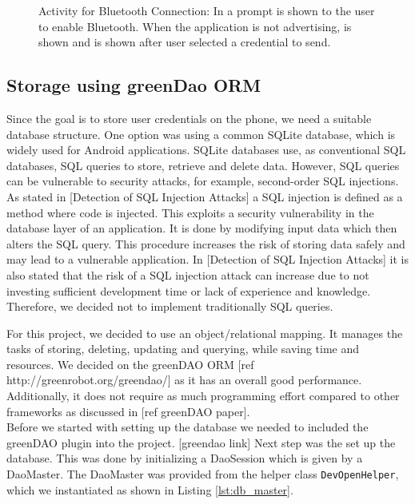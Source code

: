\begin{figure}[H]
\caption[Activity for Bluetooth Connection]{Activity for Bluetooth Connection: In \protect{} a prompt is shown to the user to enable Bluetooth. When the application is not advertising, \protect{} is shown and \protect{} is shown after user selected a credential to send.}
\label{fig:connectionactivity}
\end{figure}



\subsection{Storage using greenDao ORM}
Since the goal is to store user credentials on the phone,  we need a suitable database structure. One option was using a common SQLite database, which is widely used for Android applications. SQLite databases use, as conventional SQL databases, SQL queries to store, retrieve and delete data. However, SQL queries can be vulnerable to security attacks, for example, second-order SQL injections. As stated in [Detection of SQL Injection Attacks] a SQL injection is defined as a method where code is injected. This exploits a security vulnerability in the database layer of an application. It is done by modifying input data which then alters the SQL query. This procedure increases the risk of storing data safely and may lead to a vulnerable application. In [Detection of SQL Injection Attacks] it is also stated that the risk of a SQL injection attack can increase due to not investing sufficient development time or lack of experience and knowledge. Therefore, we decided not to implement traditionally SQL queries.

For this project, we decided to use an object/relational mapping. It manages the tasks of storing, deleting, updating and querying, while saving time and resources. We decided on the greenDAO ORM [ref http://greenrobot.org/greendao/] as it has an overall good performance. Additionally, it does not require as much programming effort compared to other frameworks as discussed in [ref greenDAO paper]. \\

Before we started with setting up the database we needed to included the greenDAO plugin into the project. [greendao link] Next step was the set up the database. This was done by initializing a DaoSession which is given by a DaoMaster. The DaoMaster was provided from the helper class \texttt{DevOpenHelper}, which we instantiated as shown in Listing \ref{lst:db_master}.

